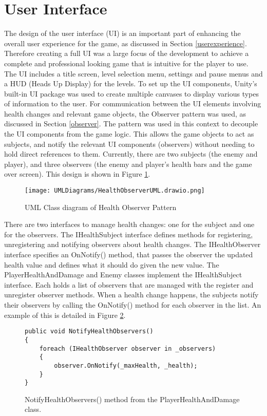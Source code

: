 \documentclass[10pt]{final_report}
\begin{document}
\section{User Interface}
The design of the user interface (UI) is an important part of enhancing the overall user experience for the game, as discussed in Section \ref{userexperience}. Therefore creating a full UI was a large focus of the development to achieve a complete and professional looking game that is intuitive for the player to use. The UI includes a title screen, level selection menu, settings and pause menus and a HUD (Heads Up Display) for the levels.  \newline
To set up the UI components, Unity's built-in UI package was used \cite{unity2024_UI} to create multiple canvases to display various types of information to the user. 
For communication between the UI elements involving health changes and relevant game objects, the Observer pattern was used, as discussed in Section \ref{observer}. The pattern was used in this context to decouple the UI components from the game logic. This allows the game objects to act as subjects, and notify the relevant UI components (observers) without needing to hold direct references to them. Currently, there are two subjects (the enemy and player), and three observers (the enemy and player's health bars and the game over screen). This design is shown in Figure \ref{fig:label_observer1}.
\begin{figure}[H]
    \centering
    \texttt{[image: UMLDiagrams/HealthObserverUML.drawio.png]}
    \caption{UML Class diagram of Health Observer Pattern}
    \label{fig:label_observer1}
\end{figure}
There are two interfaces to manage health changes: one for the subject and one for the observers. The IHealthSubject interface defines methods for registering, unregistering and notifying observers about health changes. The IHealthObserver interface specifies an OnNotify() method, that passes the observer the updated health value and defines what it should do given the new value. 
The PlayerHealthAndDamage and Enemy classes implement the IHealthSubject interface. Each holds a list of observers that are managed with the register and unregister observer methods. When a health change happens, the subjects notify their observers by calling the OnNotify() method for each observer in the list. An example of this is detailed in Figure \ref{notifyhealthobservers}.
\begin{figure}[H]
\begin{verbatim}
public void NotifyHealthObservers()
{
    foreach (IHealthObserver observer in _observers)
    {
        observer.OnNotify(_maxHealth, _health);
    }
}
\end{verbatim}
\caption{NotifyHealthObservers() method from the PlayerHealthAndDamage class.}
\label{notifyhealthobservers}
\end{figure}
\end{document}
